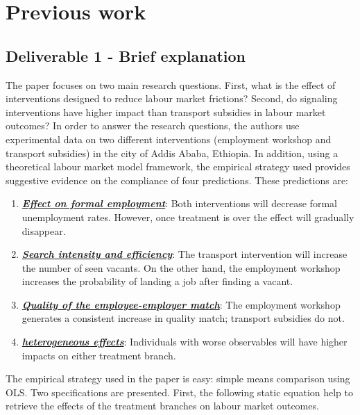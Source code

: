 \documentclass{article}
\begin{document}
\section{Previous work} \label{DF Previuos work}

    \subsection{Deliverable 1 - Brief explanation} \label{DF Deliverable 1}
    
    The paper focuses on two main research questions. First, what is the effect of interventions designed to reduce labour market frictions? Second, do signaling interventions have higher impact than transport subsidies in labour market outcomes? In order to answer the research questions, the authors use experimental data on two different interventions (employment workshop and transport subsidies) in the city of Addis Ababa, Ethiopia. In addition, using a theoretical labour market model framework, the empirical strategy used provides suggestive evidence on the compliance of four predictions. These predictions are:

    \begin{enumerate}
    
        \item \underline{\textbf{\textit{Effect on formal employment}}}: Both interventions will decrease formal unemployment rates. However, once treatment is over the effect will gradually disappear.
        
        \item \underline{\textbf{\textit{Search intensity and efficiency}}}: The transport intervention will increase the number of seen vacants. On the other hand, the employment workshop increases the probability of landing a job after finding a vacant.
        
        \item \underline{\textbf{\textit{Quality of the employee-employer match}}}: The employment workshop  generates a consistent increase in quality match; transport subsidies do not.
        
        \item \underline{\textbf{\textit{heterogeneous effects}}}: Individuals with worse observables will have higher impacts on either treatment branch.
        
    \end{enumerate}    
    
    \noindent The empirical strategy used in the paper is easy: simple means comparison using OLS. Two specifications are presented. First, the following static equation help to retrieve the effects of the treatment branches on labour market outcomes.
  
\end{document}
